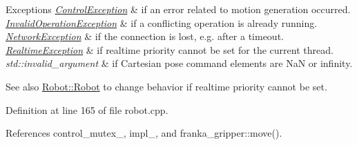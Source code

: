 \begin{DoxyExceptions}{Exceptions}
{\em \hyperlink{structfranka_1_1ControlException}{Control\+Exception}} & if an error related to motion generation occurred. \\
\hline
{\em \hyperlink{structfranka_1_1InvalidOperationException}{Invalid\+Operation\+Exception}} & if a conflicting operation is already running. \\
\hline
{\em \hyperlink{structfranka_1_1NetworkException}{Network\+Exception}} & if the connection is lost, e.\+g. after a timeout. \\
\hline
{\em \hyperlink{structfranka_1_1RealtimeException}{Realtime\+Exception}} & if realtime priority cannot be set for the current thread. \\
\hline
{\em std\+::invalid\+\_\+argument} & if Cartesian pose command elements are NaN or infinity.\\
\hline
\end{DoxyExceptions}
\begin{DoxySeeAlso}{See also}
\hyperlink{classfranka_1_1Robot_ae63bc19390df3d54f3a270814df35eb6}{Robot\+::\+Robot} to change behavior if realtime priority cannot be set. 
\end{DoxySeeAlso}


Definition at line 165 of file robot.\+cpp.



References control\+\_\+mutex\+\_\+, impl\+\_\+, and franka\+\_\+gripper\+::move().


